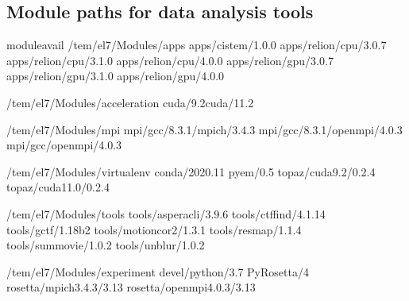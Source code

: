 \documentclass[a4paper,11pt,english]{sphinxmanual}
\begin{document}
\subsection{Module paths for data analysis tools}
\label{\detokenize{newfarm:module-paths-for-data-analysis-tools}}
\begin{sphinxVerbatim}[commandchars=\\\{\}]
\PYGZdl{}\PYGZgt{}moduleavail
\PYGZhy{}\PYGZhy{}\PYGZhy{}\PYGZhy{}\PYGZhy{}\PYGZhy{}\PYGZhy{}\PYGZhy{}/tem/el7/Modules/apps\PYGZhy{}\PYGZhy{}\PYGZhy{}\PYGZhy{}\PYGZhy{}\PYGZhy{}\PYGZhy{}\PYGZhy{}\PYGZhy{}
apps/cistem/1.0.0
apps/relion/cpu/3.0.7
apps/relion/cpu/3.1.0
apps/relion/cpu/4.0.0
apps/relion/gpu/3.0.7
apps/relion/gpu/3.1.0
apps/relion/gpu/4.0.0

\PYGZhy{}\PYGZhy{}\PYGZhy{}\PYGZhy{}/tem/el7/Modules/acceleration\PYGZhy{}\PYGZhy{}\PYGZhy{}\PYGZhy{}\PYGZhy{}
cuda/9.2cuda/11.2

\PYGZhy{}\PYGZhy{}\PYGZhy{}\PYGZhy{}\PYGZhy{}\PYGZhy{}\PYGZhy{}\PYGZhy{}\PYGZhy{}/tem/el7/Modules/mpi\PYGZhy{}\PYGZhy{}\PYGZhy{}\PYGZhy{}\PYGZhy{}\PYGZhy{}\PYGZhy{}\PYGZhy{}\PYGZhy{}
mpi/gcc/8.3.1/mpich/3.4.3
mpi/gcc/8.3.1/openmpi/4.0.3
mpi/gcc/openmpi/4.0.3

\PYGZhy{}\PYGZhy{}\PYGZhy{}\PYGZhy{}\PYGZhy{}/tem/el7/Modules/virtualenv\PYGZhy{}\PYGZhy{}\PYGZhy{}\PYGZhy{}\PYGZhy{}\PYGZhy{}
conda/2020.11
pyem/0.5
topaz/cuda\PYGZhy{}9.2/0.2.4
topaz/cuda\PYGZhy{}11.0/0.2.4

\PYGZhy{}\PYGZhy{}\PYGZhy{}\PYGZhy{}\PYGZhy{}\PYGZhy{}\PYGZhy{}\PYGZhy{}/tem/el7/Modules/tools\PYGZhy{}\PYGZhy{}\PYGZhy{}\PYGZhy{}\PYGZhy{}\PYGZhy{}\PYGZhy{}\PYGZhy{}
tools/aspera\PYGZhy{}cli/3.9.6
tools/ctffind/4.1.14
tools/gctf/1.18\PYGZus{}b2
tools/motioncor2/1.3.1
tools/resmap/1.1.4
tools/summovie/1.0.2
tools/unblur/1.0.2

\PYGZhy{}\PYGZhy{}\PYGZhy{}\PYGZhy{}\PYGZhy{}/tem/el7/Modules/experiment\PYGZhy{}\PYGZhy{}\PYGZhy{}\PYGZhy{}\PYGZhy{}\PYGZhy{}
devel/python/3.7
PyRosetta/4
rosetta/mpich\PYGZhy{}3.4.3/3.13
rosetta/openmpi\PYGZhy{}4.0.3/3.13
\end{sphinxVerbatim}
\end{document}

